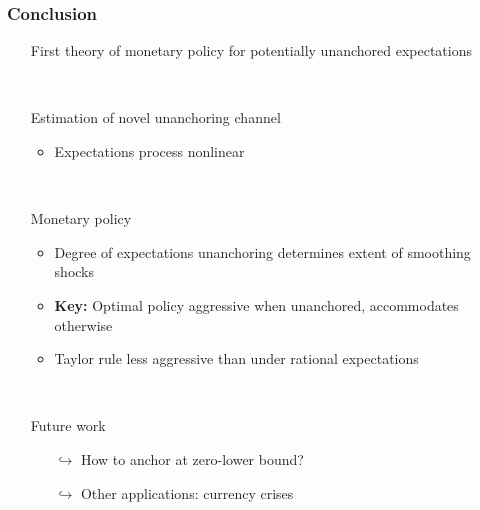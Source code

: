 \documentclass[10pt]{beamer}
\def\movei{12 }
\begin{document}
\begin{frame}
	\frametitle{Conclusion}

\vspace{0.5cm}
	
\begin{itemize}
\item[] First theory of monetary policy for potentially unanchored expectations 

\

\item[] Estimation of novel unanchoring channel
\vspace{0.1cm}
	\begin{itemize}
	\item Expectations process nonlinear
%
	\end{itemize}
\


\item[] Monetary policy
\vspace{0.1cm}

	\begin{itemize}
	\item Degree of expectations unanchoring determines extent of smoothing shocks
	\vspace{0.1cm}

	\item \textbf{Key:} Optimal policy aggressive when unanchored, accommodates otherwise
	\vspace{0.1cm}

	\item Taylor rule less aggressive than under rational expectations
	\end{itemize}
	
\


\item[] Future work
\vspace{0.1cm}

\begin{itemize}
\item[$\hookrightarrow$]  How to anchor at zero-lower bound?
\vspace{0.1cm}

\item[$\hookrightarrow$]  Other applications: currency crises
\end{itemize}


\end{itemize}


\end{frame}
\end{document}
